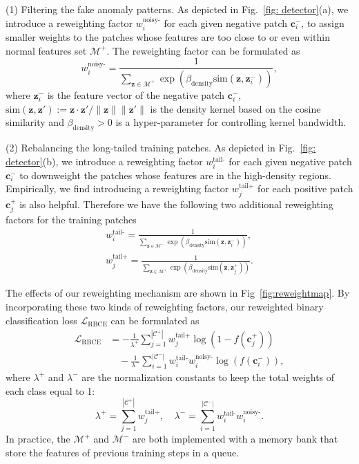 \documentclass[letterpaper]{article} %
\begin{document}
(1) Filtering the fake anomaly patterns. As depicted in Fig.~\ref{fig: detector}(a), we introduce a reweighting factor $w^\text{noisy-}_i$ for each given negative patch $\bm{c}^-_i$, to assign smaller weights to the patches whose features are too close to or even within normal features set $\mathcal{M}^+$. The reweighting factor can be formulated as
\begin{equation}
    w^\text{noisy-}_i = \frac{1}{\sum_{\bm{z}\in\mathcal{M}^+} \exp(\beta_\text{density} \text{sim}(\bm{z},\bm{z}^-_i))} ,
\end{equation}
where $\bm{z}^-_i$ is the feature vector of the negative patch $\bm{c}^-_i$, $\mathrm{sim}(\bm{z}, \bm{z}'):= \bm{z} \cdot \bm{z}'/\lVert{\bm{z}}\rVert\lVert{\bm{z}'}\rVert$ is the density kernel based on the cosine similarity and $\beta_\text{density}>0$ is a hyper-parameter for controlling kernel bandwidth.

(2) Rebalancing the long-tailed training patches. As depicted in Fig.~\ref{fig: detector}(b), we introduce a reweighting factor $w^\text{tail-}_i$ for each given negative patch $\bm{c}^-_i$ to downweight the patches whose features are in the high-density regions. Empirically, we find introducing a reweighting factor $w^\text{tail+}_j$ for each positive patch $\bm{c}^+_j$ is also helpful. Therefore we have the following two additional reweighting factors for the training patches
\begin{equation}
\begin{aligned}
    w^\text{tail-}_i = \frac{1}{\sum_{\bm{z}\in\mathcal{M}^-} \exp(\beta_\text{density} \text{sim}(\bm{z},\bm{z}^-_i))},\\
    w^\text{tail+}_j = \frac{1}{\sum_{\bm{z}\in\mathcal{M}^+} \exp(\beta_\text{density} \text{sim}(\bm{z},\bm{z}^+_j))}.
\end{aligned}
\end{equation}

The effects of our reweighting mechanism are shown in Fig~\ref{fig:reweightmap}. By incorporating these two kinds of reweighting factors, our reweighted binary classification loss $\mathcal{L}_{\mathrm{RBCE}}$ can be formulated as
\begin{equation}
\label{eq: loss_function_rbce}
\begin{aligned}
    \mathcal{L}_{\mathrm{RBCE}}&=-\frac{1}{\lambda^+}\sum_{j=1}^{|\mathcal{C}^+|} w^\text{tail+}_j\log (1-f(\bm{c}^+_j))\\
    &\quad -\frac{1}{\lambda^-}\sum_{i=1}^{|\mathcal{C}^-|} w^\text{tail-}_i w^\text{noisy-}_i \log(f(\bm{c}^-_i)),
\end{aligned}
\end{equation}
where $\lambda^+$ and $\lambda^-$ are the normalization constants to keep the total weights of each class equal to 1:
\begin{equation}
\label{eq: regularization parameter}
    \lambda^+ = \sum_{j=1}^{|\mathcal{C}^+|} w^\text{tail+}_j,\quad
    \lambda^- = \sum_{i=1}^{|\mathcal{C}^-|} w^\text{tail-}_i w^\text{noisy-}_i.
\end{equation}
In practice, the $\mathcal{M}^+$ and $\mathcal{M}^-$ are both implemented with a memory bank that store the features of previous training steps in a queue.
\end{document}

